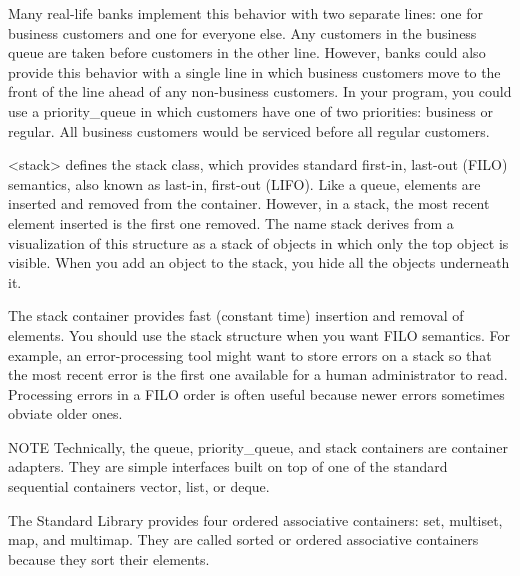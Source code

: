 Many real-life banks implement this behavior with two separate lines: one for business customers and one for everyone else. Any customers in the business queue are taken before customers in the other line. However, banks could also provide this behavior with a single line in which business customers move to the front of the line ahead of any non-business customers. In your program, you could use a priority\_queue in which customers have one of two priorities: business or regular. All business customers would be serviced before all regular customers.


<stack> defines the stack class, which provides standard first-in, last-out (FILO) semantics, also known as last-in, first-out (LIFO). Like a queue, elements are inserted and removed from the container. However, in a stack, the most recent element inserted is the first one removed. The name stack derives from a visualization of this structure as a stack of objects in which only the top object is visible. When you add an object to the stack, you hide all the objects underneath it.

The stack container provides fast (constant time) insertion and removal of elements. You should use the stack structure when you want FILO semantics. For example, an error-processing tool might want to store errors on a stack so that the most recent error is the first one available for a human administrator to read. Processing errors in a FILO order is often useful because newer errors sometimes obviate older ones.

\begin{myNotic}{NOTE}
Technically, the queue, priority\_queue, and stack containers are container adapters. They are simple interfaces built on top of one of the standard sequential containers vector, list, or deque.
\end{myNotic}


The Standard Library provides four ordered associative containers: set, multiset, map, and multimap. They are called sorted or ordered associative containers because they sort their elements.


